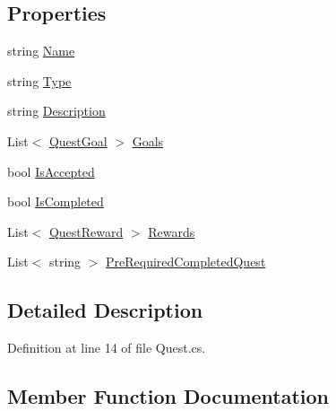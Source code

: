 \subsection*{Properties}
\begin{DoxyCompactItemize}
\item 
string \hyperlink{class_quest_a0d12fe711350d850ead300f03926e6db}{Name}
\item 
string \hyperlink{class_quest_a8dbdb675c319dd32654bf6b1ea66db01}{Type}
\item 
string \hyperlink{class_quest_afb8483a073d09ccc09ea668014a91f7a}{Description}
\item 
List$<$ \hyperlink{class_quest_goal}{Quest\+Goal} $>$ \hyperlink{class_quest_a404f8c405e51a0b892b9b93f785a7bcf}{Goals}
\item 
bool \hyperlink{class_quest_aa4cdb538ad95f876192f9e161e209448}{Is\+Accepted}
\item 
bool \hyperlink{class_quest_a571b9ac9728e3fe099fef9f5b3c9b7ef}{Is\+Completed}
\item 
List$<$ \hyperlink{class_quest_reward}{Quest\+Reward} $>$ \hyperlink{class_quest_a5b90df0034d0798ec3ba92c55b6f8118}{Rewards}
\item 
List$<$ string $>$ \hyperlink{class_quest_ab6a42ba89f28e4871036bd097b1ab1dd}{Pre\+Required\+Completed\+Quest}
\end{DoxyCompactItemize}


\subsection{Detailed Description}


Definition at line 14 of file Quest.\+cs.



\subsection{Member Function Documentation}
\mbox{\label{class_quest_a236e119719eaaed9e39874c3d7fdac68}} 

